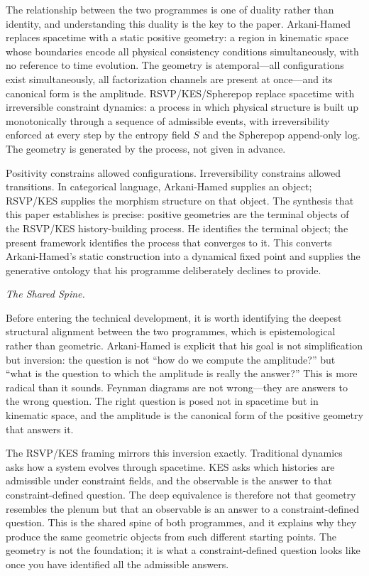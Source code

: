 \documentclass[12pt, oneside]{amsart}
\theoremstyle{plain}
\theoremstyle{definition}
\theoremstyle{remark}
\newcommand{\Sf}{S}
\begin{document}
The relationship between the two programmes is one of duality rather than identity, and understanding this duality is the key to the paper. Arkani-Hamed replaces spacetime with a static positive geometry: a region in kinematic space whose boundaries encode all physical consistency conditions simultaneously, with no reference to time evolution. The geometry is atemporal---all configurations exist simultaneously, all factorization channels are present at once---and its canonical form is the amplitude. RSVP/KES/Spherepop replace spacetime with irreversible constraint dynamics: a process in which physical structure is built up monotonically through a sequence of admissible events, with irreversibility enforced at every step by the entropy field $\Sf$ and the Spherepop append-only log. The geometry is generated by the process, not given in advance.

Positivity constrains allowed configurations. Irreversibility constrains allowed transitions. In categorical language, Arkani-Hamed supplies an object; RSVP/KES supplies the morphism structure on that object. The synthesis that this paper establishes is precise: positive geometries are the terminal objects of the RSVP/KES history-building process. He identifies the terminal object; the present framework identifies the process that converges to it. This converts Arkani-Hamed's static construction into a dynamical fixed point and supplies the generative ontology that his programme deliberately declines to provide.

\medskip\noindent\textit{The Shared Spine.}

Before entering the technical development, it is worth identifying the deepest structural alignment between the two programmes, which is epistemological rather than geometric. Arkani-Hamed is explicit that his goal is not simplification but inversion: the question is not ``how do we compute the amplitude?'' but ``what is the question to which the amplitude is really the answer?'' This is more radical than it sounds. Feynman diagrams are not wrong---they are answers to the wrong question. The right question is posed not in spacetime but in kinematic space, and the amplitude is the canonical form of the positive geometry that answers it.

The RSVP/KES framing mirrors this inversion exactly. Traditional dynamics asks how a system evolves through spacetime. KES asks which histories are admissible under constraint fields, and the observable is the answer to that constraint-defined question. The deep equivalence is therefore not that geometry resembles the plenum but that an observable is an answer to a constraint-defined question. This is the shared spine of both programmes, and it explains why they produce the same geometric objects from such different starting points. The geometry is not the foundation; it is what a constraint-defined question looks like once you have identified all the admissible answers.
\end{document}
